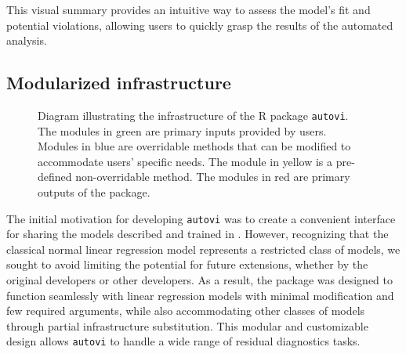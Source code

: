 \documentclass[
doublespace,
  times]{anzsauth}
\providecommand{\DIFaddbeginFL}{} %
\providecommand{\DIFaddendFL}{} %
\providecommand{\DIFdelbeginFL}{} %
\providecommand{\DIFdelendFL}{} %
\newcommand{\DIFscaledelfig}{0.5}
\newlength{\DIFdelgraphicswidth} %
\newlength{\DIFdelgraphicsheight} %
\newcommand{\DIFaddincludegraphics}[2][]{{\color{blue}\fbox{\DIFOincludegraphics[#1]{#2}}}} %
\newcommand{\DIFdelincludegraphics}[2][]{%
\sbox{\DIFdelgraphicsbox}{\DIFOincludegraphics[#1]{#2}}%
\settoboxwidth{\DIFdelgraphicswidth}{\DIFdelgraphicsbox} %
\settoboxtotalheight{\DIFdelgraphicsheight}{\DIFdelgraphicsbox} %
\scalebox{\DIFscaledelfig}{%
\parbox[b]{\DIFdelgraphicswidth}{\usebox{\DIFdelgraphicsbox}\\[-\baselineskip] \rule{\DIFdelgraphicswidth}{0em}}\llap{\resizebox{\DIFdelgraphicswidth}{\DIFdelgraphicsheight}{%
\setlength{\unitlength}{\DIFdelgraphicswidth}%
\begin{picture}(1,1)%
\thicklines\linethickness{2pt} %
{\color[rgb]{1,0,0}\put(0,0){\framebox(1,1){}}}%
{\color[rgb]{1,0,0}\put(0,0){\line( 1,1){1}}}%
{\color[rgb]{1,0,0}\put(0,1){\line(1,-1){1}}}%
\end{picture}%
}\hspace*{3pt}}} %
} %
\DeclareRobustCommand{\DIFaddbeginFL}{\DIFOaddbeginFL \let\includegraphics\DIFaddincludegraphics} %
\DeclareRobustCommand{\DIFaddendFL}{\DIFOaddendFL \let\includegraphics\DIFOincludegraphics} %
\DeclareRobustCommand{\DIFdelbeginFL}{\DIFOdelbeginFL \let\includegraphics\DIFdelincludegraphics} %
\DeclareRobustCommand{\DIFdelendFL}{\DIFOaddendFL \let\includegraphics\DIFOincludegraphics} %
\begin{document}
This visual summary provides an intuitive way to assess the model's fit
and potential violations, allowing users to quickly grasp the results of
the automated analysis.

\subsection{Modularized infrastructure}\label{sec-autovi-infrastructure}

\begin{figure}

\DIFdelbeginFL %


\DIFdelendFL \DIFaddbeginFL {}
\DIFaddendFL

\caption{\label{fig-autovi-diag}Diagram illustrating the infrastructure
of the R package \texttt{autovi}. The modules in green are primary
inputs provided by users. Modules in blue are overridable methods that
can be modified to accommodate users' specific needs. The module in
yellow is a pre-defined non-overridable method. The modules in red are
primary outputs of the package.}

\end{figure}%

The initial motivation for developing \texttt{autovi} was to create a
convenient interface for sharing the models described and trained in
\citet{li2024automated}. However, recognizing that the classical normal
linear regression model represents a restricted class of models, we
sought to avoid limiting the potential for future extensions, whether by
the original developers or other developers. As a result, the package
was designed to function seamlessly with linear regression models with
minimal modification and few required arguments, while also
accommodating other classes of models through partial infrastructure
substitution. This modular and customizable design allows
\texttt{autovi} to handle a wide range of residual diagnostics tasks.
\end{document}
